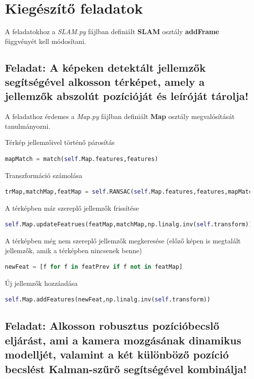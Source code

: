 \documentclass[12pt,a4paper,oneside]{report}             %
\begin{document}
\section{Kiegészítő feladatok}

A feladatokhoz a \emph{SLAM.py} fájlban definiált \textbf{SLAM} osztály \textbf{addFrame} függvényét kell módosítani.

\subsection{Feladat: A képeken detektált jellemzők segítségével alkosson térképet, amely a jellemzők abszolút pozícióját és leíróját tárolja!}

A feladathoz érdemes a \emph{Map.py} fájlban definiált \textbf{Map} osztály megvalósítását tanulmányozni.

Térkép jellemzőivel történő párosítás

\begin{lstlisting}[language=Python]
mapMatch = match(self.Map.features,features)
\end{lstlisting}

Transzformáció számolása
\begin{lstlisting}[language=Python]
trMap,matchMap,featMap = self.RANSAC(self.Map.features,features,mapMatch)
\end{lstlisting}

A térképben már szereplő jellemzők frissítése

\begin{lstlisting}[language=Python]
self.Map.updateFeatrues(featMap,matchMap,np.linalg.inv(self.transform))
\end{lstlisting}

A térképben még nem szereplő jellemzők megkeresése (előző képen is megtalált jellemzők, amik a térképben nincsenek benne)

\begin{lstlisting}[language=Python]
newFeat = [f for f in featPrev if f not in featMap]
\end{lstlisting}

Új jellemzők hozzáadása

\begin{lstlisting}[language=Python]
self.Map.addFeatures(newFeat,np.linalg.inv(self.transform))
\end{lstlisting}

\subsection{Feladat: Alkosson robusztus pozícióbecslő eljárást, ami a kamera mozgásának dinamikus modelljét, valamint a két különböző pozíció becslést Kalman-szűrő segítségével kombinálja!}
\end{document}
